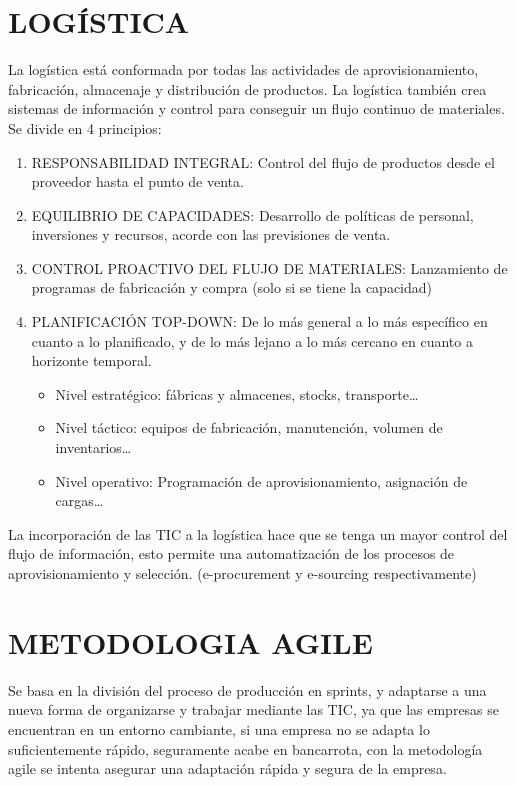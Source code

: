 \documentclass[12pt, twoside, openright]{report} %
\begin{document}
\section{LOGÍSTICA}
La logística está conformada por todas las actividades de aprovisionamiento, fabricación, almacenaje y distribución de productos. La logística también crea sistemas de información y control para conseguir un flujo continuo de materiales. Se divide en 4 principios:
\begin{enumerate}
	\item RESPONSABILIDAD INTEGRAL: Control del flujo de productos desde el proveedor hasta el punto de venta.
	\item EQUILIBRIO DE CAPACIDADES: Desarrollo de políticas de personal, inversiones y recursos, acorde con las previsiones de venta.
	\item CONTROL PROACTIVO DEL FLUJO DE MATERIALES: Lanzamiento de programas de fabricación y compra (solo si se tiene la capacidad)
	\item PLANIFICACIÓN TOP-DOWN: De lo más general a lo más específico en cuanto a lo planificado, y de lo más lejano a lo más cercano en cuanto a horizonte temporal.
	      \begin{itemize}
		      \item Nivel estratégico: fábricas y almacenes, stocks, transporte…
		      \item Nivel táctico: equipos de fabricación, manutención, volumen de inventarios…
		      \item Nivel operativo: Programación de aprovisionamiento, asignación de cargas…
	      \end{itemize}
\end{enumerate}

La incorporación de las TIC a la logística hace que se tenga un mayor control del flujo de información, esto permite una automatización de los procesos de aprovisionamiento y selección. (e-procurement y e-sourcing respectivamente)

\section{METODOLOGIA AGILE}
Se basa en la división del proceso de producción en sprints, y adaptarse a una nueva forma de organizarse y trabajar mediante las TIC, ya que las empresas se encuentran en un entorno cambiante, si una empresa no se adapta lo suficientemente rápido, seguramente acabe en bancarrota, con la metodología agile se intenta asegurar una adaptación rápida y segura de la empresa.
\end{document}
